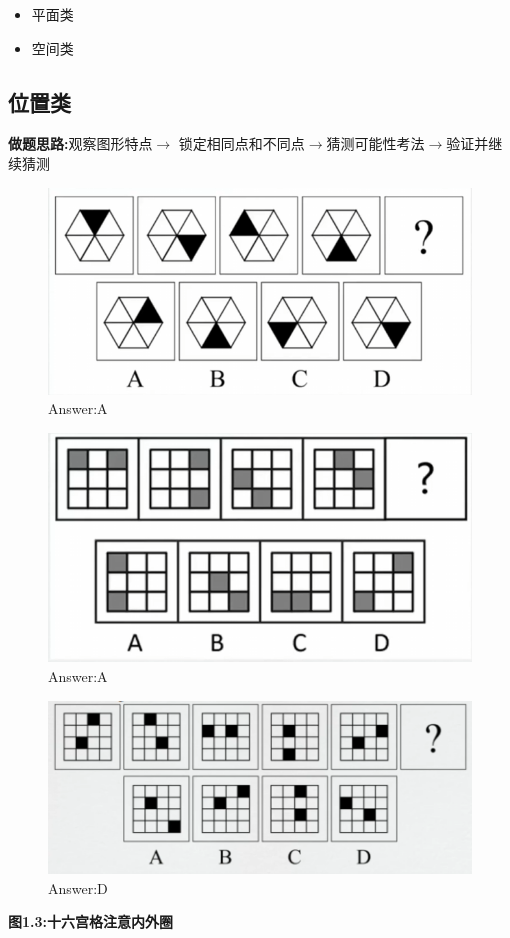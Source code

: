 \documentclass{article}
\numberwithin{equation}{section}						%
\numberwithin{figure}{section}							%
\begin{document}
\begin{sloppypar}
\begin{itemize}
\begin{itemize}
\begin{itemize}
    \item 平面类
    \item 空间类
\end{itemize}
\end{itemize}
\end{itemize}

\subsection{位置类}

\textbf{做题思路:}观察图形特点$\rightarrow$ 锁定相同点和不同点$\rightarrow$猜测可能性考法$\rightarrow$验证并继续猜测


\begin{figure}[H]
     \centering
     \includegraphics[width=0.5\linewidth]{1.png}
		\caption{Answer:A}
 \end{figure}

\begin{figure}[H]
     \centering
     \includegraphics[width=0.5\linewidth]{2.png}
		\caption{Answer:A}
 \end{figure}

\begin{figure}[H]
     \centering
     \includegraphics[width=0.5\linewidth]{3.png}
		\caption{Answer:D}
 \end{figure}

\textbf{图1.3:十六宫格注意内外圈}


\end{sloppypar}
\end{document}
